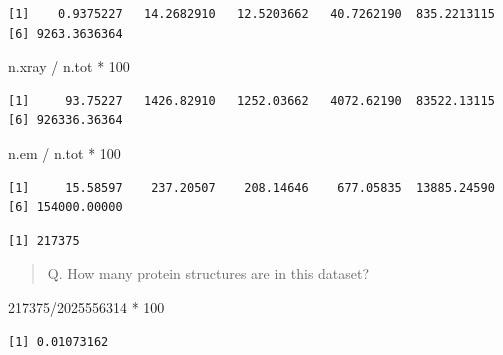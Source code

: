 \documentclass[
  letterpaper,
  DIV=11,
  numbers=noendperiod]{scrartcl}
\newenvironment{Shaded}{\begin{snugshade}}{\end{snugshade}}
\newcommand{\DecValTok}[1]{\textcolor[rgb]{0.68,0.00,0.00}{#1}}
\newcommand{\NormalTok}[1]{\textcolor[rgb]{0.00,0.23,0.31}{#1}}
\newcommand{\SpecialCharTok}[1]{\textcolor[rgb]{0.37,0.37,0.37}{#1}}
\begin{document}
\begin{verbatim}
[1]    0.9375227   14.2682910   12.5203662   40.7262190  835.2213115
[6] 9263.3636364
\end{verbatim}

\begin{Shaded}
\begin{Highlighting}[]
\NormalTok{n.xray }\SpecialCharTok{/}\NormalTok{ n.tot }\SpecialCharTok{*} \DecValTok{100}
\end{Highlighting}
\end{Shaded}

\begin{verbatim}
[1]     93.75227   1426.82910   1252.03662   4072.62190  83522.13115
[6] 926336.36364
\end{verbatim}

\begin{Shaded}
\begin{Highlighting}[]
\NormalTok{n.em }\SpecialCharTok{/}\NormalTok{ n.tot }\SpecialCharTok{*} \DecValTok{100}
\end{Highlighting}
\end{Shaded}

\begin{verbatim}
[1]     15.58597    237.20507    208.14646    677.05835  13885.24590
[6] 154000.00000
\end{verbatim}

\begin{Shaded}
\end{Shaded}

\begin{verbatim}
[1] 217375
\end{verbatim}

\begin{quote}
Q. How many protein structures are in this dataset?
\end{quote}

\begin{Shaded}
\begin{Highlighting}[]
\DecValTok{217375}\SpecialCharTok{/}\DecValTok{2025556314} \SpecialCharTok{*} \DecValTok{100}
\end{Highlighting}
\end{Shaded}

\begin{verbatim}
[1] 0.01073162
\end{verbatim}
\end{document}
